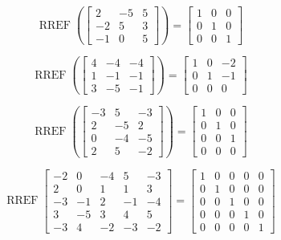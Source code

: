 \documentclass{article}
\DeclareMathOperator{\RREF}{RREF}
\begin{document}
\[\RREF\left(\begin{bmatrix}
2 & -5 & 5\\
-2 & 5 & 3\\
-1 & 0 & 5
\end{bmatrix}\right)=
\begin{bmatrix} 
1 & 0 & 0 \\
0 & 1 & 0\\
0 & 0 & 1
\end{bmatrix}\]


\[\RREF\left(\begin{bmatrix}
4 & -4 & -4\\
1 & -1 & -1\\
3 & -5 & -1
\end{bmatrix}\right)=
\begin{bmatrix} 
1 & 0 & -2\\
0 & 1 & -1\\
0 & 0 & 0
\end{bmatrix}\]

\[\RREF\left(\begin{bmatrix}
-3 & 5 & -3 \\
2 & -5 & 2 \\
0 & -4 & -5 \\
2 & 5 & -2 
\end{bmatrix}\right)=
\begin{bmatrix} 
1 & 0 & 0 \\
0 & 1 & 0 \\
0 & 0 & 1 \\
0 & 0 & 0
\end{bmatrix}\]

\[
  \RREF\begin{bmatrix}
    -2 & 0 & -4 & 5 & -3 \\
    2 & 0 & 1 & 1 & 3 \\
    -3 & -1 & 2 & -1 & -4 \\
    3 & -5 & 3 & 4 & 5 \\
    -3 & 4 & -2 & -3 & -2
  \end{bmatrix} =
  \begin{bmatrix}
    1 & 0 & 0 & 0 &0 \\
    0 & 1 & 0 & 0 & 0\\
    0 & 0 & 1 & 0 & 0 \\
    0 & 0 & 0 & 1 & 0\\
    0 & 0 & 0 & 0 & 1
  \end{bmatrix}
\]



\end{document}
